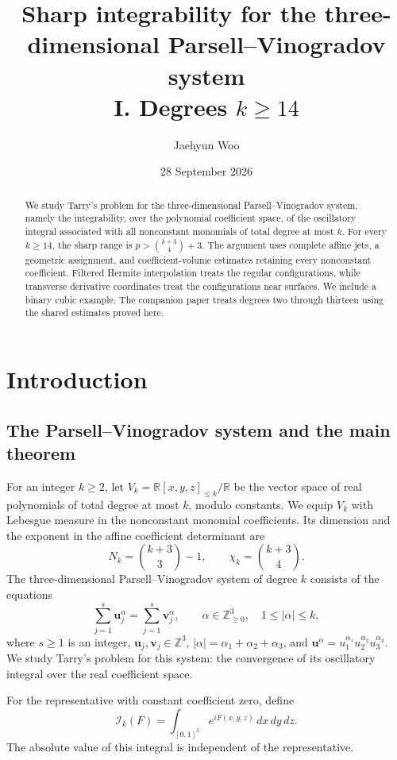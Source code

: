 \documentclass[11pt]{amsart}
\title[Parsell--Vinogradov integrability I]{Sharp integrability for the three-dimensional Parsell--Vinogradov system\\I. Degrees $k\ge14$}
\author{Jaehyun Woo}
\date{28 September 2026}
\theoremstyle{definition}
\theoremstyle{remark}
\newcommand{\R}{\mathbb R}
\numberwithin{equation}{section}
\begin{document}
\begin{abstract}
We study Tarry's problem for the three-dimensional Parsell--Vinogradov system, namely the integrability, over the polynomial coefficient space, of the oscillatory integral associated with all nonconstant monomials of total degree at most $k$. For every $k\ge14$, the sharp range is $p>\binom{k+3}{4}+3$. The argument uses complete affine jets, a geometric assignment, and coefficient-volume estimates retaining every nonconstant coefficient. Filtered Hermite interpolation treats the regular configurations, while transverse derivative coordinates treat the configurations near surfaces. We include a binary cubic example. The companion paper treats degrees two through thirteen using the shared estimates proved here.
\end{abstract}
\maketitle\enlargethispage{6pt}
\tableofcontents


\section{Introduction}\label{root:introduction}

\subsection{The Parsell--Vinogradov system and the main theorem}\label{intro:main}

For an integer $k\ge2$, let $V_k=\R[x,y,z]_{\le k}/\R$ be the vector space of real polynomials of total degree at most $k$, modulo constants. We equip $V_k$ with Lebesgue measure in the nonconstant monomial coefficients. Its dimension and the exponent in the affine coefficient determinant are
\[
N_k=\binom{k+3}{3}-1,\qquad \chi_k=\binom{k+3}{4}.
\]
The three-dimensional Parsell--Vinogradov system of degree $k$ consists of the equations
\[
\sum_{j=1}^s\mathbf u_j^\alpha=\sum_{j=1}^s\mathbf v_j^\alpha,\qquad \alpha\in\mathbb Z_{\ge0}^3,\quad 1\le|\alpha|\le k,
\]
where $s\ge1$ is an integer, $\mathbf u_j,\mathbf v_j\in\mathbb Z^3$, $|\alpha|=\alpha_1+\alpha_2+\alpha_3$, and $\mathbf u^\alpha=u_1^{\alpha_1}u_2^{\alpha_2}u_3^{\alpha_3}$. We study Tarry's problem for this system: the convergence of its oscillatory integral over the real coefficient space.

For the representative with constant coefficient zero, define
\[
 \mathcal I_k(F)=\int_{[0,1]^3}e^{iF(x,y,z)}\,dx\,dy\,dz.
\]
The absolute value of this integral is independent of the representative.
\end{document}
